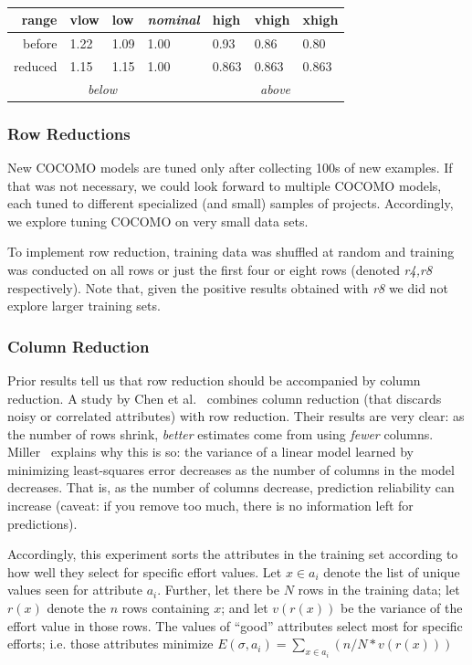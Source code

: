\documentclass{sig-alternate}
\begin{document}
{\scriptsize   
~~~~~~\begin{tabular}{r|ll|l|lll|}
      range      & vlow&  low&{\em nominal}&high&vhigh&xhigh\\\hline
     before & 1.22& 1.09& 1.00& 0.93& 0.86& 0.80\\
     reduced&1.15& 1.15& 1.00&  0.863& 0.863&0.863\\\cline{2-3}\cline{5-7}
                 & \multicolumn{2}{c|}{{\em below}} &&\multicolumn{3}{c|}{{\em above}}
\end{tabular}
 }
\subsubsection{Row Reductions}\label{sect:row}
New COCOMO models are tuned only after collecting
100s of new examples. If that was not necessary, we could look forward to multiple
COCOMO models, each tuned to different specialized (and small) samples of projects.
Accordingly, we explore tuning COCOMO
on very small data sets.

To implement  row reduction, training data was
shuffled at random and training was conducted on
all rows or  just the first four or eight  rows
(denoted {\em r4,r8} respectively). Note that, given  the positive
results obtained with {\em r8} we did not explore larger training sets.



\subsubsection{Column Reduction}\label{sect:pruner}

Prior results tell us that row reduction should be
accompanied by column reduction.  A study by Chen et
al.~\cite{chen05a} combines column reduction (that
discards noisy or correlated attributes) with row
reduction. Their results are very clear: as the
number of rows shrink, {\em better} estimates come
from using {\em fewer}
columns. Miller~\cite{miller02} explains  why this is so:  the variance of a
linear model learned by minimizing least-squares error decreases as the number of columns in the model
decreases. That is, as the number of columns decrease,
prediction reliability can increase (caveat: 
if you remove too much,
there is no information left for predictions).

Accordingly, this experiment sorts the attributes in the training set according
to how well they select for specific effort values. 
Let $x\in a_i$ denote the list of unique values seen for attribute $a_i$. Further,
let there be $N$ rows in the training data; 
let  $r(x)$ denote the $n$ rows containing $x$; and let $v(r(x))$ be the variance
of the effort value in those rows. The values of ``good'' attributes
select most for specific efforts; i.e. those attributes minimize
$E(\sigma,a_i) =\sum_{x\in a_i} \left(n/N * v(r(x))\right)$
\end{document}
